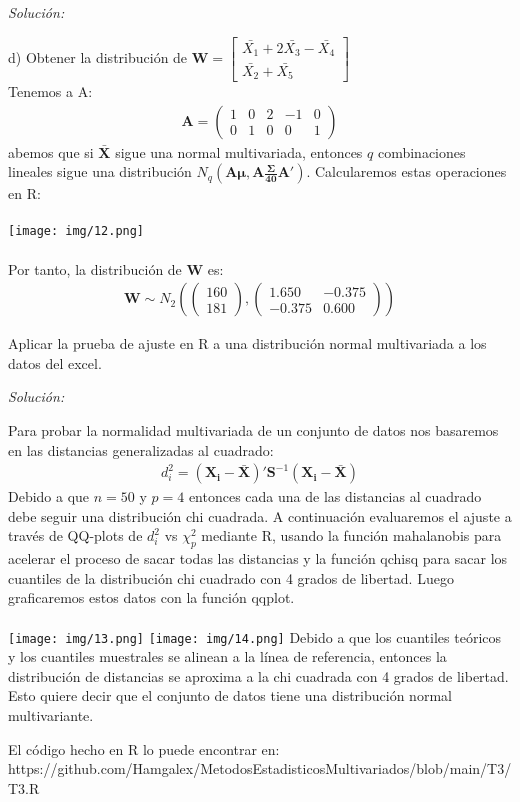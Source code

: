 \documentclass[12pt]{article}
\newenvironment{problem}[2][Problema]{\begin{trivlist}
\item[\hskip \labelsep {\bfseries #1}\hskip \labelsep {\bfseries #2.}]}{\end{trivlist}}
\newenvironment{sol}
    {\emph{Solución:}
    }
    {
    }
\begin{document}
\begin{sol}
d) Obtener la distribución de $\mathbf{W}= \begin{bmatrix}
\bar{X_1} + 2\bar{X_3}-\bar{X_4} \\
\bar{X_2}+\bar{X_5}
\end{bmatrix}$\\
Tenemos a A:
\begin{align*}\mathbf{A}=
\begin{pmatrix}
1 & 0 & 2 & -1 & 0\\
0 & 1 & 0 & 0 & 1
\end{pmatrix}
\end{align*}
abemos que si $\mathbf{\bar{X}}$ sigue una normal multivariada, entonces  $q$ combinaciones lineales sigue una distribución $N_q(\mathbf{A \mu , A \frac{\Sigma}{40} A'})$. Calcularemos estas operaciones en R:\\\\
\texttt{[image: img/12.png]}\\\\
Por tanto, la distribución de $\mathbf{W}$ es:
\begin{align*}
\mathbf{W}\sim N_2(\begin{pmatrix}
160\\181
\end{pmatrix}, 
\begin{pmatrix}
1.650 & -0.375 \\
-0.375 & 0.600
\end{pmatrix})
\end{align*}
\end{sol}

\pagebreak

\begin{problem}{3}
Aplicar la prueba de ajuste en R a una distribución normal multivariada a los datos del excel.
\end{problem}

\begin{sol}
Para probar la normalidad multivariada de un conjunto de datos nos basaremos en las distancias generalizadas al cuadrado:
\begin{align*}
d_i^2=(\mathbf{X_i-\bar{X}})'\mathbf{S}^{-1}(\mathbf{X_i-\bar{X}})
\end{align*}
Debido a que $n=50$ y $p=4$ entonces cada una de las distancias al cuadrado debe seguir una distribución chi cuadrada. A continuación evaluaremos el ajuste a través de QQ-plots de $d_i^2$ vs $\chi_p^2$ mediante R, usando la función  mahalanobis para acelerar el proceso de sacar todas las distancias y la función qchisq para sacar los cuantiles de la distribución chi cuadrado con 4 grados de libertad. Luego graficaremos estos datos con la función qqplot.
\\\\
\texttt{[image: img/13.png]}
\texttt{[image: img/14.png]}
Debido a que los cuantiles teóricos y los cuantiles muestrales se alinean a la línea de referencia, entonces la distribución de distancias se aproxima a la chi cuadrada con 4 grados de libertad. Esto quiere decir que el conjunto de datos tiene una distribución normal multivariante.
\end{sol}

\pagebreak

El código hecho en R lo puede encontrar en:\\ https://github.com/Hamgalex/MetodosEstadisticosMultivariados/blob/main/T3/T3.R
\end{document}
